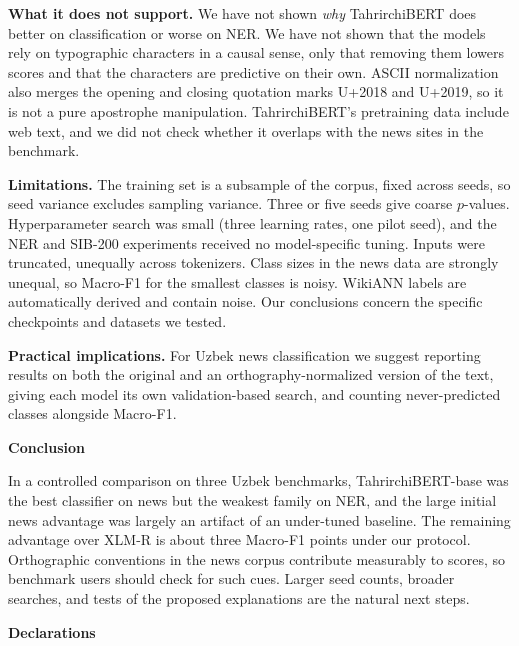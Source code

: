 \documentclass[11pt]{book}
\begin{document}
\textbf{What it does not support.} We have not shown \emph{why} TahrirchiBERT does better on classification or worse on NER. We have not shown that the models rely on typographic characters in a causal sense, only that removing them lowers scores and that the characters are predictive on their own. ASCII normalization also merges the opening and closing quotation marks U+2018 and U+2019, so it is not a pure apostrophe manipulation. TahrirchiBERT's pretraining data include web text, and we did not check whether it overlaps with the news sites in the benchmark.

\textbf{Limitations.} The training set is a subsample of the corpus, fixed across seeds, so seed variance excludes sampling variance. Three or five seeds give coarse $p$-values. Hyperparameter search was small (three learning rates, one pilot seed), and the NER and SIB-200 experiments received no model-specific tuning. Inputs were truncated, unequally across tokenizers. Class sizes in the news data are strongly unequal, so Macro-F1 for the smallest classes is noisy. WikiANN labels are automatically derived and contain noise. Our conclusions concern the specific checkpoints and datasets we tested.

\textbf{Practical implications.} For Uzbek news classification we suggest reporting results on both the original and an orthography-normalized version of the text, giving each model its own validation-based search, and counting never-predicted classes alongside Macro-F1.

\begin{center}
\textbf{Conclusion}
\end{center}

In a controlled comparison on three Uzbek benchmarks, TahrirchiBERT-base was the best classifier on news but the weakest family on NER, and the large initial news advantage was largely an artifact of an under-tuned baseline. The remaining advantage over XLM-R is about three Macro-F1 points under our protocol. Orthographic conventions in the news corpus contribute measurably to scores, so benchmark users should check for such cues. Larger seed counts, broader searches, and tests of the proposed explanations are the natural next steps.

\begin{center}
\textbf{Declarations}
\end{center}
\end{document}
